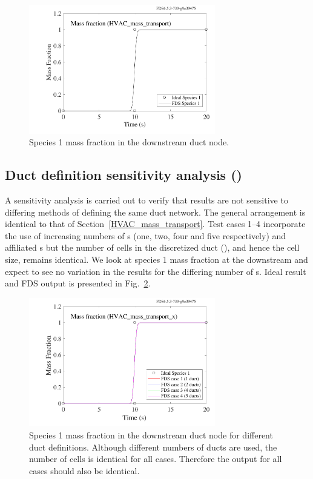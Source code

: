 \documentclass[11pt]{book}
\begin{document}
\begin{figure}[ht]
\centering
\includegraphics[width=3.2in]{SCRIPT_FIGURES/HVAC_mass_transport}
\caption[ test case.]{Species \num{1} mass fraction in the downstream duct node.}
\label{fig_HVAC_mass_transport}
\end{figure}

\subsection{Duct definition sensitivity analysis (\texorpdfstring{}{HVAC\_mass\_transport\_\x})}
\label{HVAC_mass_transport_1}
\label{HVAC_mass_transport_2}
\label{HVAC_mass_transport_3}
\label{HVAC_mass_transport_4}
A sensitivity analysis is carried out to verify that results are not sensitive to differing methods of defining the same duct network. The general arrangement is identical to that of Section~\ref{HVAC_mass_transport}. Test cases \numrange{1}{4} incorporate the use of increasing numbers of s (one, two, four and five respectively) and affiliated s but the number of cells in the discretized duct (), and hence the cell size, remains identical. We look at species \num{1} mass fraction at the downstream  and expect to see no variation in the results for the differing number of s. Ideal result and FDS output is presented in Fig.~\ref{fig_HVAC_mass_transport_x}.

\begin{figure}[ht]
\centering
\includegraphics[width=3.2in]{SCRIPT_FIGURES/HVAC_mass_transport_x}
\caption[ test case.]{Species \num{1} mass fraction in the downstream duct node for different duct definitions. Although different numbers of ducts are used, the number of cells is identical for all cases. Therefore the output for all cases should also be identical.}
\label{fig_HVAC_mass_transport_x}
\end{figure}
\end{document}
